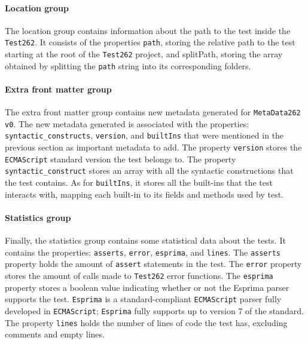 \documentclass[runningheads]{llncs}
\begin{document}
\paragraph{Location group}
The location group contains information about the path to the test inside the \texttt{Test262}. It consists of the properties \texttt{path}, storing the relative path to the test starting at the root of the \texttt{Test262} project, and splitPath, storing the array obtained by splitting the \texttt{path} string into its corresponding folders.


\paragraph{Extra front matter group}
The extra front matter group contains new metadata generated for \texttt{MetaData262 v0}. The new metadata generated is associated with the properties: \texttt{syntactic\_constructs}, \texttt{version}, and \texttt{builtIns} that were mentioned in the previous section as important metadata to add. The property \texttt{version} stores the \texttt{ECMAScript} standard version the test belongs to. The property \texttt{syntactic\_construct} stores an array with all the syntactic constructions that the test contains. As for \texttt{builtIns}, it stores all the built-ins that the test interacts with, mapping each built-in to its fields and methods used by test. 


\paragraph{Statistics group}
Finally, the statistics group contains some statistical data about the tests. It contains the properties: \texttt{asserts}, \texttt{error}, \texttt{esprima}, and \texttt{lines}. The \texttt{asserts} property holds the amount of \texttt{assert} statements in the test. The \texttt{error} property stores the amount of calls made to \texttt{Test262} error functions. The \texttt{esprima} property stores a boolean value indicating whether or not the Esprima\cite{Esprima} parser supports the test. \texttt{Esprima} is a standard-compliant \texttt{ECMAScript} parser fully developed in \texttt{ECMAScript}; \texttt{Esprima} fully supports up to version 7 of the standard. The property \texttt{lines} holds the number of lines of code the test has, excluding comments and empty lines.
\end{document}
